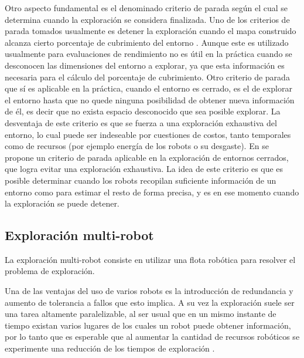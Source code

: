 
Otro aspecto fundamental es el denominado criterio de parada según el cual se
determina cuando la exploración se considera finalizada. Uno de los criterios
de parada tomados usualmente es detener la exploración cuando el mapa
construido alcanza cierto porcentaje de cubrimiento del entorno
\cite{Yan2015}. Aunque este es utilizado usualmente para evaluaciones de
rendimiento no es útil en la práctica cuando se desconocen las dimensiones del
entorno a explorar, ya que esta información es necesaria para el cálculo del
porcentaje de cubrimiento.
Otro criterio de parada que sí es aplicable en la práctica, cuando el entorno es
cerrado, es el de explorar el entorno hasta que no quede ninguna posibilidad de
obtener nueva información de él, es decir que no exista espacio desconocido
que sea posible explorar. La desventaja de este criterio es que se fuerza a una
exploración exhaustiva del entorno, lo cual puede ser indeseable por cuestiones
de costos, tanto temporales como de recursos (por ejemplo energía de los robots o
su desgaste). En \cite{Amorin2019} se propone un criterio de parada aplicable en la exploración de entornos cerrados, que logra 
evitar una exploración exhaustiva. La idea de este criterio es
que es posible determinar cuando los robots recopilan suficiente información de
un entorno como para estimar el resto de forma precisa, y es en ese momento cuando la
exploración se puede detener.



\subsection{Exploración multi-robot}\label{subsec:expmutirob}
La exploración multi-robot consiste en utilizar una flota robótica para resolver
el problema de exploración.

Una de las ventajas del uso de varios robots es la introducción de redundancia y
aumento de tolerancia a fallos que esto implica. A su vez la exploración suele
ser una tarea altamente paralelizable, al ser usual que en un mismo instante de
tiempo existan varios lugares de los cuales un robot puede obtener información,
por lo tanto que es esperable que al aumentar la cantidad de recursos robóticos
se experimente una reducción de los tiempos de exploración
\cite{cao1997cooperative,dudek1996taxonomy,guzzoni1997many}. 

